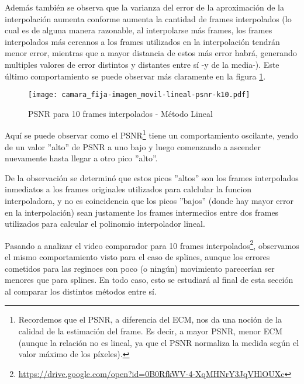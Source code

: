 \par Adem\'as tambi\'en se observa que la varianza del error de la
aproximaci\'on de la interpolaci\'on aumenta conforme aumenta la cantidad de
frames interpolados (lo cual es de alguna manera razonable, al interpolarse
m\'as frames, los frames interpolados m\'as cercanos a los frames utilizados en
la interpolaci\'on tendr\'an menor error, mientras que a mayor distancia de
estos m\'as error habr\'a, generando multiples valores de error distintos y
distantes entre s\'i -y de la media-). Este \'ultimo comportamiento se puede
observar m\'as claramente en la figura \ref{fig:fija-movil_lineal-psnr-k10}.

\begin{figure}
    \centering
    \texttt{[image: camara\_fija-imagen\_movil-lineal-psnr-k10.pdf]}
    \caption{PSNR para 10 frames interpolados - M\'etodo Lineal}
    \label{fig:fija-movil_lineal-psnr-k10}
\end{figure}

\par Aqu\'i se puede observar como el PSNR\footnote{Recordemos que el PSNR, a
diferencia del ECM, nos da una noci\'on de la calidad de la estimaci\'on del
frame. Es decir, a mayor PSNR, menor ECM (aunque la relaci\'on no es lineal, ya
que el PSNR normaliza la medida seg\'un el valor m\'aximo de los p\'ixeles).}
tiene un comportamiento oscilante, yendo de un valor ''alto'' de PSNR a uno
bajo y luego comenzando a ascender nuevamente hasta llegar a otro pico ''alto''.

\par De la observaci\'on se determin\'o que estos picos ''altos'' son los frames
interpolados inmediatos a los frames originales utilizados para calclular la
funcion interpoladora, y no es coincidencia que los picos ''bajos'' (donde hay
mayor error en la interpolaci\'on) sean justamente los frames intermedios entre
dos frames utilizados para calcular el polinomio interpolador lineal.

\par Pasando a analizar el video comparador para 10 frames
interpolados\footnote{\url{https://drive.google.com/open?id=0B0RfkWV-4-XqMHNrY3JqVHlOUXc}},
observamos el mismo comportamiento visto para el caso de splines, aunque los
errores cometidos para las reginoes con poco (o ning\'un) movimiento
parecer\'ian ser menores que para splines. En todo caso, esto se estudiar\'a al
final de esta secci\'on al comparar los distintos m\'etodos entre s\'i.

